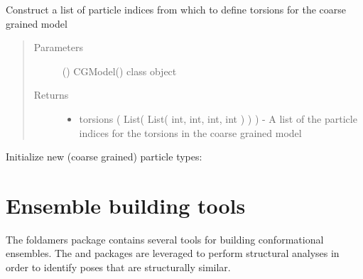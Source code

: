 \documentclass[letterpaper,12pt,english,openany,oneside]{sphinxmanual}
\begin{document}
\begin{fulllineitems}

\begin{fulllineitems}
\label{\detokenize{cg_model:cg_model.cgmodel.CGModel.get_torsion_list}}
Construct a list of particle indices from which to define torsions for the coarse grained model
\begin{quote}\begin{description}
\item[{Parameters}] \leavevmode
{} () \textendash{} CGModel() class object

\item[{Returns}] \leavevmode
\begin{itemize}
\item {} 
torsions ( List( List( int, int, int, int ) ) ) - A list of the particle indices for the torsions in the coarse grained model

\end{itemize}


\end{description}\end{quote}

\end{fulllineitems}


\begin{fulllineitems}
\label{\detokenize{cg_model:cg_model.cgmodel.CGModel.nonbonded_interaction_list}}
Initialize new (coarse grained) particle types:

\end{fulllineitems}


\end{fulllineitems}



\chapter{Ensemble building tools}
\label{\detokenize{ensembles:ensemble-building-tools}}\label{\detokenize{ensembles::doc}}
The foldamers package contains several tools for building conformational ensembles.  The  and  packages are leveraged to perform structural analyses in order to identify poses that are structurally similar.
\end{document}
